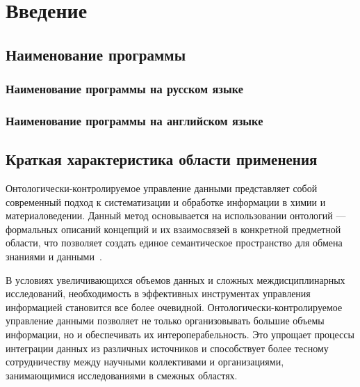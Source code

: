 \documentclass[a4paper,12pt,reqno]{article}
\begin{document}
    \project{\unskip}

    \firstPage
    \newpage

    \secondPage
    \newpage

    \thirdPage
    \newpage


    \section{Введение}

    \subsection{Наименование программы}

    \subsubsection{Наименование программы на русском языке}
    \unskip

    \subsubsection{Наименование программы на английском языке}
    \unskip

    \subsection{Краткая характеристика области применения}
    Онтологически-контролируемое управление данными представляет собой современный подход к систематизации и обработке информации в химии и материаловедении. Данный метод основывается на использовании онтологий — формальных описаний концепций и их взаимосвязей в конкретной предметной области, что позволяет создать единое семантическое пространство для обмена знаниями и данными~\cite{ontology:base}.

    В условиях увеличивающихся объемов данных и сложных междисциплинарных исследований, необходимость в эффективных инструментах управления информацией становится все более очевидной. Онтологически-контролируемое управление данными позволяет не только организовывать большие объемы информации, но и обеспечивать их интероперабельность. Это упрощает процессы интеграции данных из различных источников и способствует более тесному сотрудничеству между научными коллективами и организациями, занимающимися исследованиями в смежных областях.
    \newpage
\end{document}
